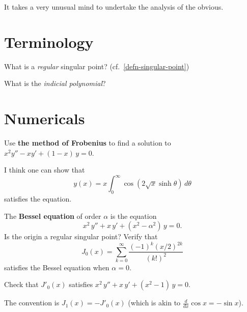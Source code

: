\documentclass{homework}
\author{Jim Fowler}
\begin{document}
\maketitle

\begin{inspiration}
It takes a very unusual mind to undertake the analysis of the obvious. \\
\end{inspiration}

\section{Terminology}

\begin{problem}
  What is a \textit{regular} singular point?  (cf.~\ref{defn-singular-point})
\end{problem}

\begin{problem}
  What is the \textit{indicial polynomial}?
\end{problem}

\section{Numericals}

\begin{problem}
  Use \textbf{the method of Frobenius} to find a solution to \(x^2 y'' - x y' + (1-x) \, y = 0\).

\end{problem}

\begin{solution}
  I think one can show that
  \[
    y(x) = x \int_0^\infty \cos \left(2 \sqrt{x} \sinh \theta\right) \, d\theta
  \]
  satisfies the equation.
\end{solution}

\begin{problem}\label{bessel-j0}The \textbf{Bessel equation} of order
  $\alpha$ is the equation
  \[
    x^2 \, y'' + x \, y' + (x^2 - \alpha^2) \, y = 0.
  \]
  Is the origin a regular singular point?  Verify that
  \[
    J_0(x) = \sum_{k=0}^\infty \frac{(-1)^k (x/2)^{2k}}{(k!)^2}
  \]
  satisfies the Bessel equation when $\alpha = 0$.
\end{problem}

\begin{problem}
  Check that $J'_0(x)$ satisfies \(x^2 \, y'' + x \, y' + (x^2 - 1) \, y = 0\).
  
  The convention is $J_1(x) = - J'_0(x)$ (which is akin to $\frac{d}{dx} \cos x = - \sin x$).
\end{problem}
\end{document}
